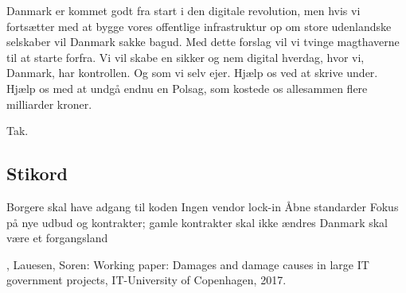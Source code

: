 \documentclass[fleqn]{article}
\begin{document}
Danmark er kommet godt fra start i den digitale revolution, men hvis vi fortsætter
med at bygge vores offentlige infrastruktur op om store udenlandske selskaber
vil Danmark sakke bagud.
Med dette forslag vil vi tvinge magthaverne til at starte forfra. Vi vil
skabe en sikker og nem digital hverdag, hvor vi, Danmark, har kontrollen.
Og som vi selv ejer. Hjælp os ved at skrive under. 
Hjælp os med at undgå endnu en Polsag, som kostede os allesammen flere
milliarder kroner.

Tak.

\subsection{Stikord}
Borgere skal have adgang til koden
Ingen vendor lock-in
Åbne standarder
Fokus på nye udbud og kontrakter; gamle kontrakter skal ikke ændres
Danmark skal være et forgangsland

\begin{thebibliography}{1}

, Lauesen, Soren: Working paper: Damages and damage causes in
large IT government projects, IT-University of Copenhagen, 2017.
\end{thebibliography}
\end{document}
